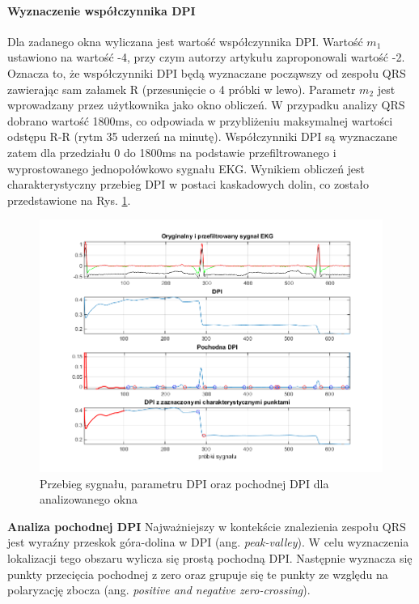 \documentclass[10pt,a4paper]{article}
\begin{document}
\paragraph{Wyznaczenie współczynnika DPI}
Dla zadanego okna wyliczana jest wartość współczynnika DPI. Wartość $m_1$ ustawiono na wartość -4, przy czym autorzy artykułu \cite{dpi_qrs} zaproponowali wartość -2. Oznacza to, że współczynniki DPI będą wyznaczane począwszy od zespołu QRS zawierając sam załamek R (przesunięcie o 4 próbki w lewo). Parametr $m_2$ jest wprowadzany przez użytkownika jako okno obliczeń. W przypadku analizy QRS dobrano wartość 1800ms, co odpowiada w przybliżeniu maksymalnej wartości odstępu R-R (rytm 35 uderzeń na minutę). Współczynniki DPI są wyznaczane zatem dla przedziału 0 do 1800ms na podstawie przefiltrowanego i wyprostowanego jednopołówkowo sygnału EKG. Wynikiem obliczeń jest charakterystyczny przebieg DPI w postaci kaskadowych dolin, co zostało przedstawione na Rys. \ref{dpi_plot}. 
\begin{figure}[h]
    \centering
    \includegraphics[width=1\textwidth]{img/DPI_single.png}
    \caption{Przebieg sygnału, parametru DPI oraz pochodnej DPI dla analizowanego okna}
    \label{dpi_plot}
\end{figure}
\newline
\textbf{Analiza pochodnej DPI}
\newline
Najważniejszy w kontekście znalezienia zespołu QRS jest wyraźny przeskok góra-dolina w DPI (ang. \textit{peak-valley}). W celu wyznaczenia lokalizacji tego obszaru wylicza się prostą pochodną DPI. Następnie wyznacza się punkty przecięcia pochodnej z zero oraz grupuje się te punkty ze względu na polaryzację zbocza (ang. \textit{positive and negative zero-crossing}). 
\end{document}
